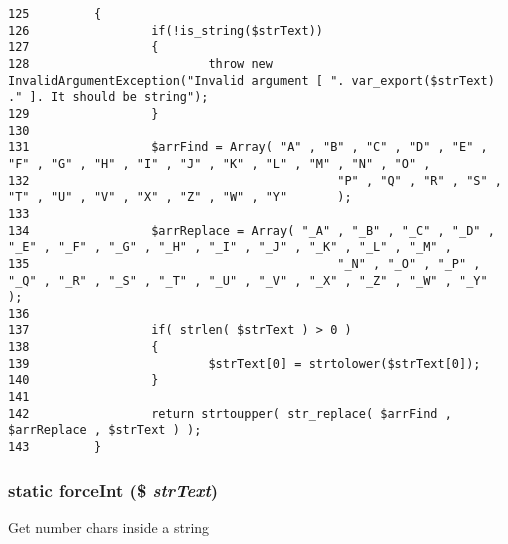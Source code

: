 \begin{Code}\begin{verbatim}125         {
126                 if(!is_string($strText))
127                 {
128                         throw new InvalidArgumentException("Invalid argument [ ". var_export($strText) ." ]. It should be string");
129                 }
130 
131                 $arrFind = Array( "A" , "B" , "C" , "D" , "E" , "F" , "G" , "H" , "I" , "J" , "K" , "L" , "M" , "N" , "O" ,
132                                           "P" , "Q" , "R" , "S" , "T" , "U" , "V" , "X" , "Z" , "W" , "Y"       );
133 
134                 $arrReplace = Array( "_A" , "_B" , "_C" , "_D" , "_E" , "_F" , "_G" , "_H" , "_I" , "_J" , "_K" , "_L" , "_M" ,
135                                           "_N" , "_O" , "_P" , "_Q" , "_R" , "_S" , "_T" , "_U" , "_V" , "_X" , "_Z" , "_W" , "_Y"      );
136 
137                 if( strlen( $strText ) > 0 )
138                 {
139                         $strText[0] = strtolower($strText[0]);
140                 }
141 
142                 return strtoupper( str_replace( $arrFind , $arrReplace , $strText ) );
143         }
\end{verbatim}
\end{Code}


\hypertarget{class_coruja_string_manipulation_10744dda31797395d8f7a4a56e61bb51}{
\subsubsection[{forceInt}]{\setlength{\rightskip}{0pt plus 5cm}static forceInt (\$ {\em strText})}}
\label{class_coruja_string_manipulation_10744dda31797395d8f7a4a56e61bb51}


Get number chars inside a string

